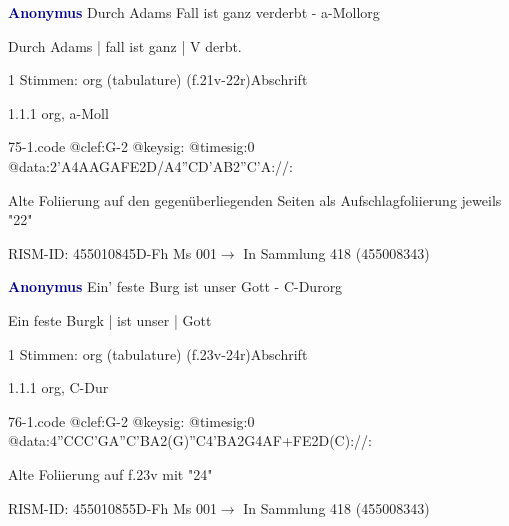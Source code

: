 \documentclass[twocolumn, 12pt]{book}
\begin{document}
\par \vspace{16pt} \textcolor{darkblue}{\textbf{Anonymus  }}\hfillplus{\textbf{[75]}}\newline Durch Adams Fall ist ganz verderbt - a-Moll\newline org
\par \begin{itshape}[f.21v, at left:] Durch Adams | fall ist ganz | V derbt.\end{itshape} 
\par \textcolor{darkblue}{}  1 Stimmen: org (tabulature)  (f.21v-22r)\newline Abschrift
\par 1.1.1  org, a-Moll  
\begin{filecontents*}{75-1.code}
@clef:G-2
@keysig:
@timesig:0
@data:2'A4AAGAFE2D/A4''CD'AB2''C'A://:
\end{filecontents*}
\newline %
\par Alte Foliierung auf den gegenüberliegenden Seiten als Aufschlagfoliierung jeweils "22"
\par RISM-ID: 455010845\newline D-Fh  Ms 001\newline $\rightarrow$ In Sammlung 418 (455008343)
      
\par \vspace{16pt} \textcolor{darkblue}{\textbf{Anonymus  }}\hfillplus{\textbf{[76]}}\newline Ein' feste Burg ist unser Gott - C-Dur\newline org
\par \begin{itshape}[f.24r, at left:] Ein feste Burgk | ist unser | Gott\end{itshape} 
\par \textcolor{darkblue}{}  1 Stimmen: org (tabulature)  (f.23v-24r)\newline Abschrift
\par 1.1.1  org, C-Dur  
\begin{filecontents*}{76-1.code}
@clef:G-2
@keysig:
@timesig:0
@data:4''CCC'GA''C'BA2(G)''C4'BA2G4AF+FE2D(C)://:
\end{filecontents*}
\newline %
\par Alte Foliierung auf f.23v mit "24"
\par RISM-ID: 455010855\newline D-Fh  Ms 001\newline $\rightarrow$ In Sammlung 418 (455008343)
      
\end{document}
